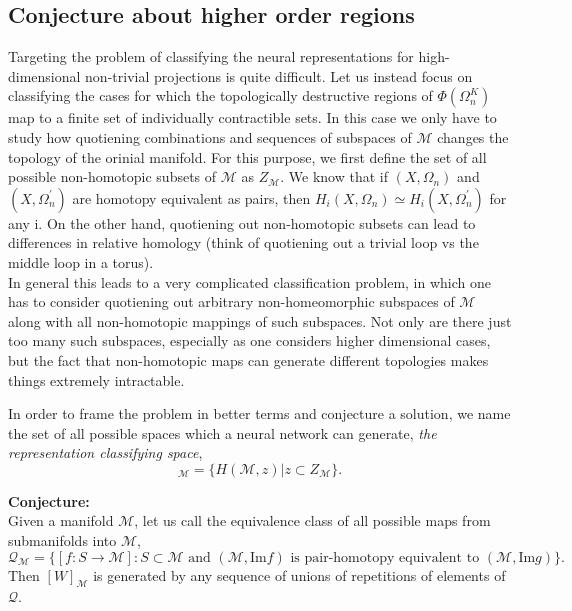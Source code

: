 \subsection{Conjecture about higher order regions}
Targeting the problem of classifying the neural representations for high-dimensional non-trivial projections is quite difficult. Let us instead focus on classifying the cases for which the topologically destructive regions of $\Phi(\Omega^K_n)$ map to a finite set of individually contractible sets. In this case we only have to study how quotiening combinations and sequences of subspaces of $\mathcal{M}$ changes the topology of the orinial manifold. For this purpose, we first define the set of all possible non-homotopic subsets of $\mathcal{M}$ as $Z_\mathcal{M}$. We know that if $(X,\Omega_n)$ and $(X,\Omega_n^{'})$ are homotopy equivalent as pairs, then $H_i(X,\Omega_n) \simeq H_i(X, \Omega_n^{'})$ for any i. On the other hand, quotiening out non-homotopic subsets can lead to differences in relative homology (think of quotiening out a trivial loop vs the middle loop in a torus). \\

In general this leads to a very complicated classification problem, in which one has to consider quotiening out arbitrary non-homeomorphic subspaces of $\mathcal{M}$ along with all non-homotopic mappings of such subspaces. Not only are there just too many such subspaces, especially as one considers higher dimensional cases, but the fact that non-homotopic maps can generate different topologies makes things extremely intractable. 

In order to frame the problem in better terms and conjecture a solution, we name the set of all possible spaces which a neural network can generate, \textit{the representation classifying space},
\begin{equation}
    [W]_\mathcal{M} = \{H(\mathcal{M},z) | z \subset Z_\mathcal{M}\}.
\end{equation}

\textbf{Conjecture:}\\
Given a manifold $\mathcal{M}$, let us call the equivalence class of all possible maps from submanifolds into $\mathcal{M}$, 
\begin{equation*}
    \mathcal{Q}_\mathcal{M}=\{[f:S \to \mathcal{M}] : S \subset \mathcal{M} \text{ and } (\mathcal{M},\text{Im}f) \text{ is pair-homotopy equivalent to } (\mathcal{M},\text{Im}g)\}.
\end{equation*}
Then $[W]_\mathcal{M}$ is generated by any sequence of unions of repetitions of elements of $\mathcal{Q}$.

